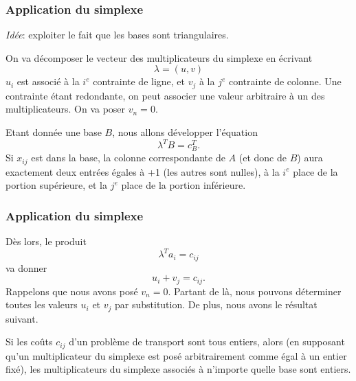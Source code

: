 \documentclass[usepdftitle=false]{beamer}
\begin{document}
\begin{frame}
\frametitle{Application du simplexe}

{\sl Idée}: exploiter le fait que les bases sont triangulaires.

\mbox{}

On va décomposer le vecteur des multiplicateurs du simplexe en écrivant
\[
\lambda = (u,v)
\]
$u_i$ est associé à la $i^e$ contrainte de ligne, et $v_j$ à la $j^e$ contrainte de colonne. Une contrainte étant redondante, on peut associer une valeur arbitraire à un des multiplicateurs. On va poser $v_n = 0$.

\mbox{}

Etant donnée une base $B$, nous allons développer l'équation
\[
\lambda^T B = c_B^T.
\]
Si $x_{ij}$ est dans la base, la colonne correspondante de $A$ (et donc de $B$) aura exactement deux entrées égales à +1 (les autres sont nulles), à la $i^e$ place de la portion supérieure, et la $j^e$ place de la portion inférieure.

\end{frame}

\begin{frame}
\frametitle{Application du simplexe}

Dès lors, le produit
\[
\lambda^T a_i = c_{ij}
\]
va donner
\[
u_i + v_j = c_{ij}.
\]
Rappelons que nous avons posé $v_n = 0$. Partant de là, nous pouvons déterminer toutes les valeurs $u_i$ et $v_j$ par substitution. De plus, nous avons le résultat suivant.

\begin{mltheorem}
Si les coûts $c_{ij}$ d'un problème de transport sont tous entiers, alors (en supposant qu'un multiplicateur du simplexe est posé arbitrairement comme égal à un entier fixé), les multiplicateurs du simplexe associés à n'importe quelle base sont entiers.
\end{mltheorem}

\end{frame}
\end{document}
